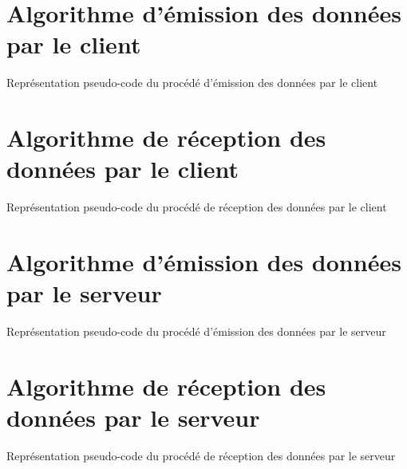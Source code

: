 \section{Algorithme d'émission des données par le client}

\begin{algorithm}[H]
	\KwResult{ - }
\caption{Représentation pseudo-code du procédé d'émission des données par le client}
\end{algorithm}

\section{Algorithme de réception des données par le client}

\begin{algorithm}[H]
	\KwResult{ - }
\caption{Représentation pseudo-code du procédé de réception des données par le client}
\end{algorithm}

\section{Algorithme d'émission des données par le serveur}

\begin{algorithm}[H]
	\KwResult{ - }
\caption{Représentation pseudo-code du procédé d'émission des données par le serveur}
\end{algorithm}

\section{Algorithme de réception des données par le serveur}

\begin{algorithm}[H]
	\KwResult{ - }
\caption{Représentation pseudo-code du procédé de réception des données par le serveur}
\end{algorithm}

